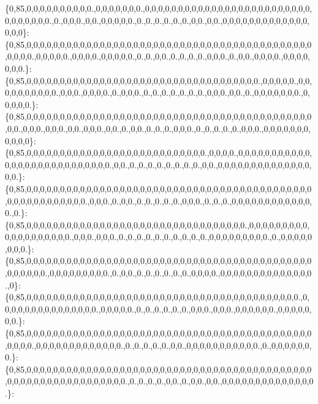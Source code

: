 \{0,85,0,0,0,0,0,0,0,0,0,0.,0,0,0,0,0,0,0.,0,0,0,0,0,0,0,0,0,0,0,0,0,0,0,0,0,0,0,0,0,0,0,0,0,0,0,0,0,0,0,0.,0.,0,0,0.,0,0.,0,0,0,0,0.,0.,0.,0.,0.,0.,0.,0,0.,0,0.,0,0,0,0,0,0,0,0,0,0,0,0,0,0,0,0\}\+: \{0,85,0,0,0,0,0,0,0,0,0,0,0,0,0,0,0,0,0,0,0,0,0,0,0,0,0,0,0,0,0,0,0,0,0,0,0,0,0,0,0,0,0,0,0,0,0,0,0.,0,0,0,0,0.,0,0,0,0.,0,0,0,0,0.,0.,0.,0,0.,0.,0.,0.,0.,0,0,0.,0.,0,0.,0,0,0,0.,0,0,0,0,0,0,0.\}\+: \{0,85,0,0,0,0,0,0,0,0,0,0,0,0,0,0,0,0,0,0,0,0,0,0,0,0,0,0,0,0,0,0,0,0,0,0,0.,0,0,0,0,0.,0,0,0,0,0,0,0,0,0,0.,0,0,0.,0,0,0,0.,0.,0,0,0.,0.,0.,0.,0.,0.,0.,0.,0,0,0.,0,0.,0.,0,0,0,0,0,0,0.,0,0,0,0,0.\}\+: \{0,85,0,0,0,0,0,0,0,0,0,0,0,0,0,0,0,0,0,0,0,0,0,0,0,0,0,0,0,0,0,0,0,0,0,0,0,0,0,0,0,0,0,0,0,0,0.,0,0,0.,0,0,0.,0,0.,0,0,0.,0,0.,0.,0,0.,0.,0.,0.,0,0,0.,0.,0.,0.,0.,0.,0,0,0.,0,0,0,0,0,0,0,0,0,0,0\}\+: \{0,85,0,0,0,0,0,0,0,0,0,0,0,0,0,0,0,0,0,0,0,0,0,0,0,0,0,0,0.,0,0,0,0.,0,0,0,0,0,0,0,0,0,0,0,0,0,0,0,0,0,0,0,0,0,0,0,0,0,0,0.,0,0.,0.,0.,0.,0.,0.,0.,0.,0.,0,0.,0,0,0,0,0,0,0,0,0,0,0,0,0,0,0,0.\}\+: \{0,85,0,0,0,0,0,0,0,0,0,0,0,0,0,0,0,0,0,0,0,0,0,0,0,0,0,0,0,0,0,0,0,0,0,0,0,0,0,0,0,0,0,0,0,0,0,0,0,0,0,0,0,0,0,0,0.,0,0,0.,0.,0,0.,0.,0.,0.,0.,0.,0,0,0.,0.,0.,0.,0,0,0,0,0,0,0,0,0,0,0,0,0.,0.\}\+: \{0,85,0,0,0,0,0,0,0,0,0,0,0,0,0,0,0,0,0,0,0,0,0,0,0,0,0,0,0,0,0,0,0,0,0.,0,0,0,0,0,0,0,0,0,0,0,0,0,0,0,0,0,0,0.,0,0,0.,0,0,0.,0.,0.,0.,0.,0.,0.,0.,0.,0.,0.,0,0,0,0,0,0,0,0,0.,0.,0,0,0,0,0,0,0,0.\}\+: \{0,85,0,0,0,0,0,0,0,0,0,0,0,0,0,0,0,0,0,0,0,0,0,0,0,0,0,0,0,0,0,0,0,0,0,0,0,0,0,0,0,0,0,0,0,0,0,0,0,0,0.,0,0,0,0,0,0,0,0,0.,0.,0,0.,0.,0.,0.,0.,0.,0.,0,0,0,0.,0,0,0,0,0,0,0,0,0,0,0,0,0,0.,0\}\+: \{0,85,0,0,0,0,0,0,0,0,0,0,0,0,0,0,0,0,0,0,0,0,0,0,0,0,0,0,0,0,0,0,0,0,0,0,0,0,0,0,0,0,0.,0,0,0,0,0,0,0,0,0,0,0,0,0,0,0.,0,0,0,0,0.,0.,0.,0.,0.,0.,0.,0,0,0.,0,0,0.,0,0,0,0,0,0.,0,0,0,0,0,0,0.\}\+: \{0,85,0,0,0,0,0,0,0,0,0,0,0,0,0,0,0,0,0,0,0,0,0,0,0,0,0,0,0,0,0,0,0,0,0,0,0,0,0,0,0,0,0,0,0,0,0,0,0.,0,0,0,0,0,0,0,0,0,0,0,0,0.,0.,0.,0.,0.,0.,0,0.,0,0,0,0,0,0,0,0,0,0,0.,0.,0,0,0,0,0,0,0.\}\+: \{0,85,0,0,0,0,0,0,0,0,0,0,0,0,0,0,0,0,0,0,0,0,0,0,0,0,0,0,0,0,0,0,0,0,0,0,0,0,0,0,0,0,0,0,0,0,0,0,0,0,0,0,0,0,0,0,0,0,0,0,0,0,0.,0.,0.,0.,0.,0,0.,0.,0,0.,0,0.,0,0,0,0,0,0,0,0,0,0,0,0,0,0.\}\+: 